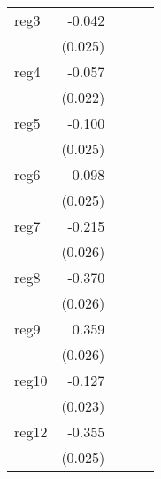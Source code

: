 {\begin{longtable}{l*{4}{D{.}{.}{-1}}}
\addlinespace
reg3        &      -0.042         &                     &                     &                     \\
            &     (0.025)         &                     &                     &                     \\
\addlinespace
reg4        &      -0.057\sym{*}  &                     &                     &                     \\
            &     (0.022)         &                     &                     &                     \\
\addlinespace
reg5        &      -0.100\sym{***}&                     &                     &                     \\
            &     (0.025)         &                     &                     &                     \\
\addlinespace
reg6        &      -0.098\sym{***}&                     &                     &                     \\
            &     (0.025)         &                     &                     &                     \\
\addlinespace
reg7        &      -0.215\sym{***}&                     &                     &                     \\
            &     (0.026)         &                     &                     &                     \\
\addlinespace
reg8        &      -0.370\sym{***}&                     &                     &                     \\
            &     (0.026)         &                     &                     &                     \\
\addlinespace
reg9        &       0.359\sym{***}&                     &                     &                     \\
            &     (0.026)         &                     &                     &                     \\
\addlinespace
reg10       &      -0.127\sym{***}&                     &                     &                     \\
            &     (0.023)         &                     &                     &                     \\
\addlinespace
reg12       &      -0.355\sym{***}&                     &                     &                     \\
            &     (0.025)         &                     &                     &                     \\

\end{longtable}}
